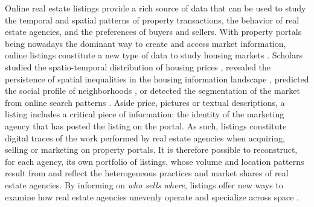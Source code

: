 Online real estate listings provide a rich source of data that can be used to study the temporal and spatial patterns of property transactions, the behavior of real estate agencies, and the preferences of buyers and sellers. With property portals being nowadays the dominant way to create and access market information, online listings constitute a new type of data to study housing markets \cite{sawyer1999ict, boeing2017new, boulay2021moving}. Scholars studied the spatio-temporal distribution of housing prices \cite{yao2018mapping,adolfsen_segmentation_2022}, revealed the persistence of spatial inequalities in the housing information landscape \cite{boeing2020online}, predicted the social profile of neighborhoods \cite{delmelle2021language}, or detected the segmentation of the market from online search patterns \cite{rae2015online}.
Aside price, pictures or textual descriptions, a listing includes a critical piece of information: the identity of the marketing agency that has posted the listing on the portal. As such, listings constitute digital traces \cite{salganikbit2017} of the work performed by real estate agencies when acquiring, selling or marketing on property portals. It is therefore possible to reconstruct, for each agency, its own portfolio of listings, whose volume and location patterns result from and reflect the heterogeneous practices and market shares of real estate agencies. By informing on \textit{who sells where}, listings offer new ways to examine how real estate agencies unevenly operate and specialize across space \cite{palm1976RealEstate}.


